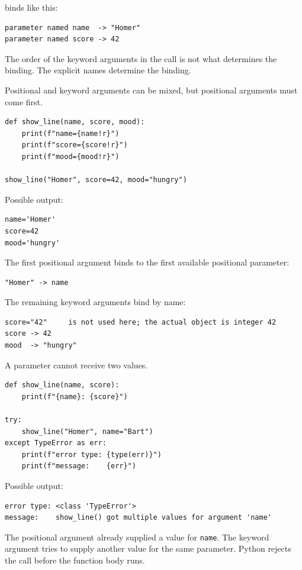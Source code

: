 binds like this:

\begin{verbatim}
parameter named name  -> "Homer"
parameter named score -> 42
\end{verbatim}

The order of the keyword arguments in the call is not what determines the binding. The explicit names determine the binding.

Positional and keyword arguments can be mixed, but positional arguments must come first.

\begin{verbatim}
def show_line(name, score, mood):
    print(f"name={name!r}")
    print(f"score={score!r}")
    print(f"mood={mood!r}")

show_line("Homer", score=42, mood="hungry")
\end{verbatim}

Possible output:

\begin{verbatim}
name='Homer'
score=42
mood='hungry'
\end{verbatim}

The first positional argument binds to the first available positional parameter:

\begin{verbatim}
"Homer" -> name
\end{verbatim}

The remaining keyword arguments bind by name:

\begin{verbatim}
score="42"     is not used here; the actual object is integer 42
score -> 42
mood  -> "hungry"
\end{verbatim}

A parameter cannot receive two values.

\begin{verbatim}
def show_line(name, score):
    print(f"{name}: {score}")

try:
    show_line("Homer", name="Bart")
except TypeError as err:
    print(f"error type: {type(err)}")
    print(f"message:    {err}")
\end{verbatim}

Possible output:

\begin{verbatim}
error type: <class 'TypeError'>
message:    show_line() got multiple values for argument 'name'
\end{verbatim}

The positional argument already supplied a value for \texttt{name}. The keyword argument tries to supply another value for the same parameter. Python rejects the call before the function body runs.

